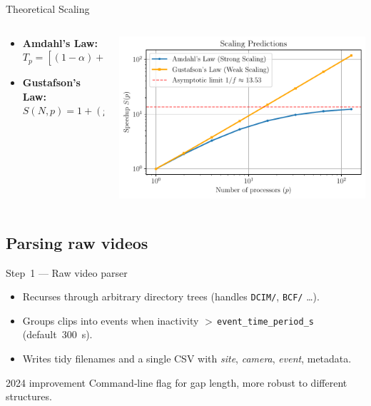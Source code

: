 \documentclass[aspectratio=169,xcolor=dvipsnames,t]{beamer}
\begin{document}
\begin{frame}{Theoretical Scaling}
  \begin{columns}[c]
    \begin{column}{0.35\linewidth}
      \begin{itemize}
      \item \textbf{Amdahl's Law:} $T_p = \left[(1-\alpha) + \frac{\alpha}{p}\right]T_{1}$
      \item \textbf{Gustafson's Law:} $S(N, p) = 1 + (p-1)\alpha(N)$
      \end{itemize}
    \end{column}
    \begin{column}{0.65\linewidth}
      \centering
      \includegraphics[width=\linewidth]{figs/scaling_laws.pdf}
    \end{column}
  \end{columns}
\end{frame}

\subsection{Parsing raw videos}
\begin{frame}{Step 1 — Raw video parser}
  \begin{itemize}
    \item Recurses through arbitrary directory trees (handles \texttt{DCIM/}, \texttt{BCF/} …).
    \item Groups clips into events when inactivity $>\,$\texttt{event\_time\_period\_s} (default 300 s).
    \item Writes tidy filenames and a single CSV with \emph{site}, \emph{camera}, \emph{event}, metadata.
  \end{itemize}
  \begin{block}{2024 improvement}
    Command‑line flag for gap length, more robust to different structures.
  \end{block}
\end{frame}
\end{document}
